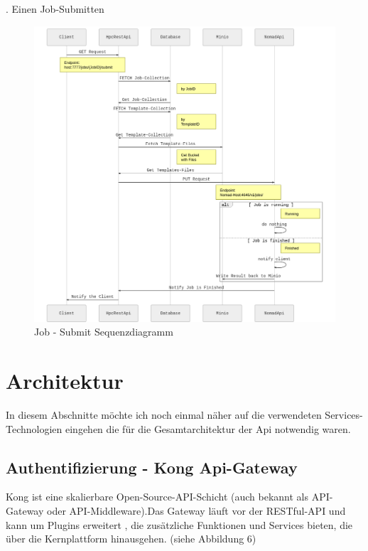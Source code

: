 \documentclass[12pt]{article}
\begin{document}
. Einen Job-Submitten
\begin{figure}[h!]
  \centering

  \includegraphics[width=\textwidth]{images/jobsubmit.png}
  \caption{Job - Submit Sequenzdiagramm }
  \label{}

\end{figure}





\newpage

\section{Architektur}

In diesem Abschnitte möchte ich noch einmal näher auf die verwendeten Services-Technologien eingehen die für die Gesamtarchitektur der Api notwendig waren.

\subsection{Authentifizierung - Kong Api-Gateway }

Kong \cite{KONGAPI} ist eine skalierbare Open-Source-API-Schicht (auch bekannt als API-Gateway oder API-Middleware).Das Gateway läuft vor der RESTful-API und kann um Plugins erweitert , die zusätzliche Funktionen und Services bieten, die über die Kernplattform hinausgehen. (siehe Abbildung 6)
\end{document}

